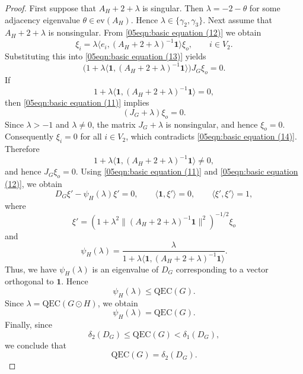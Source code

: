 \documentclass[10pt,a4paper]{amsart}
\begin{document}
\begin{proof}
First suppose that $A_H+2+\lambda$ is singular.
Then $\lambda=-2-\theta$ for some adjacency eigenvalue
$\theta\in \mathrm{ev}(A_H)$.
Hence $\lambda\in\{\gamma_2,\gamma_3\}$. Next assume that $A_H+2+\lambda$ is nonsingular.
From \eqref{05eqn:basic equation (12)} we obtain
\[
\xi_i
=\lambda
\langle e_i,(A_H+2+\lambda)^{-1}\mathbf1\rangle
\xi_o,
\qquad i\in V_2.
\]
Substituting this into \eqref{05eqn:basic equation (13)} yields
\[
\bigl(
1+\lambda\langle \mathbf1,(A_H+2+\lambda)^{-1}\mathbf1\rangle
\bigr)
J_G\xi_o=0.
\]
If
\[
1+\lambda\langle \mathbf1,(A_H+2+\lambda)^{-1}\mathbf1\rangle=0,
\]
then \eqref{05eqn:basic equation (11)} implies
\[
(J_G+\lambda)\xi_o=0.
\]
Since $\lambda>-1$ and $\lambda\ne 0$, the matrix $J_G+\lambda$ is nonsingular,
and hence $\xi_o=0$.
Consequently $\xi_i=0$ for all $i\in V_2$, which contradicts
\eqref{05eqn:basic equation (14)}.
Therefore
\[
1+\lambda\langle \mathbf1,(A_H+2+\lambda)^{-1}\mathbf1\rangle\neq0,
\]
and hence $J_G\xi_o=0$.
Using \eqref{05eqn:basic equation (11)} and \eqref{05eqn:basic equation (12)},
we obtain
\[
D_G\xi'-\psi_H(\lambda)\xi'=0,
\qquad
\langle \mathbf1,\xi'\rangle=0,
\qquad
\langle \xi',\xi'\rangle=1,
\]
where
\[
\xi'
=
\left(
1+\lambda^2
\|(A_H+2+\lambda)^{-1}\mathbf1\|^2
\right)^{-1/2}
\xi_o
\]
and
\[
\psi_H(\lambda)
=
\frac{\lambda}{
1+\lambda\langle \mathbf1,(A_H+2+\lambda)^{-1}\mathbf1\rangle}.
\]
Thus, we have $\psi_H(\lambda)$ is an eigenvalue of $D_G$ corresponding to a vector orthogonal to
$\mathbf1$.
Hence
\[
\psi_H(\lambda)\le \mathrm{QEC}(G).
\]
Since $\lambda=\mathrm{QEC}(G\odot H)$, we obtain
\[
\psi_H(\lambda)=\mathrm{QEC}(G).
\]
Finally, since
\[
\delta_2(D_G)\le \mathrm{QEC}(G)<\delta_1(D_G),
\]
we conclude that
\[
\mathrm{QEC}(G)=\delta_2(D_G).
\]
\end{proof}
\end{document}
